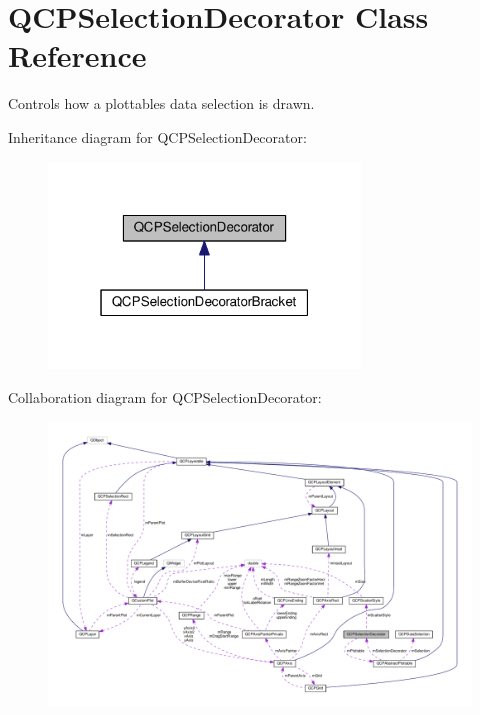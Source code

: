 \hypertarget{classQCPSelectionDecorator}{}\section{Q\+C\+P\+Selection\+Decorator Class Reference}
\label{classQCPSelectionDecorator}


Controls how a plottable\textquotesingle{}s data selection is drawn.  




Inheritance diagram for Q\+C\+P\+Selection\+Decorator\+:
\nopagebreak
\begin{figure}[H]
\begin{center}
\leavevmode
\includegraphics[width=235pt]{classQCPSelectionDecorator__inherit__graph}
\end{center}
\end{figure}


Collaboration diagram for Q\+C\+P\+Selection\+Decorator\+:
\nopagebreak
\begin{figure}[H]
\begin{center}
\leavevmode
\includegraphics[width=350pt]{classQCPSelectionDecorator__coll__graph}
\end{center}
\end{figure}
